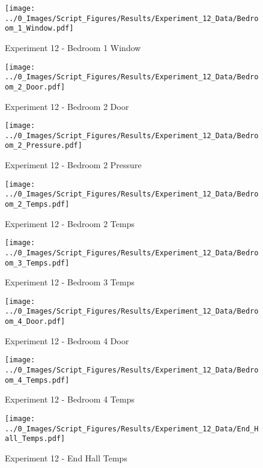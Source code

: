 	\clearpage

	\begin{figure}[H]
		\centering
		\texttt{[image: ../0\_Images/Script\_Figures/Results/Experiment\_12\_Data/Bedroom\_1\_Window.pdf]}
		\caption[]{Experiment 12 - Bedroom 1 Window}
	\end{figure}
 

	\begin{figure}[H]
		\centering
		\texttt{[image: ../0\_Images/Script\_Figures/Results/Experiment\_12\_Data/Bedroom\_2\_Door.pdf]}
		\caption[]{Experiment 12 - Bedroom 2 Door}
	\end{figure}
 
	\clearpage

	\begin{figure}[H]
		\centering
		\texttt{[image: ../0\_Images/Script\_Figures/Results/Experiment\_12\_Data/Bedroom\_2\_Pressure.pdf]}
		\caption[]{Experiment 12 - Bedroom 2 Pressure}
	\end{figure}
 

	\begin{figure}[H]
		\centering
		\texttt{[image: ../0\_Images/Script\_Figures/Results/Experiment\_12\_Data/Bedroom\_2\_Temps.pdf]}
		\caption[]{Experiment 12 - Bedroom 2 Temps}
	\end{figure}
 
	\clearpage

	\begin{figure}[H]
		\centering
		\texttt{[image: ../0\_Images/Script\_Figures/Results/Experiment\_12\_Data/Bedroom\_3\_Temps.pdf]}
		\caption[]{Experiment 12 - Bedroom 3 Temps}
	\end{figure}
 

	\begin{figure}[H]
		\centering
		\texttt{[image: ../0\_Images/Script\_Figures/Results/Experiment\_12\_Data/Bedroom\_4\_Door.pdf]}
		\caption[]{Experiment 12 - Bedroom 4 Door}
	\end{figure}
 
	\clearpage

	\begin{figure}[H]
		\centering
		\texttt{[image: ../0\_Images/Script\_Figures/Results/Experiment\_12\_Data/Bedroom\_4\_Temps.pdf]}
		\caption[]{Experiment 12 - Bedroom 4 Temps}
	\end{figure}
 

	\begin{figure}[H]
		\centering
		\texttt{[image: ../0\_Images/Script\_Figures/Results/Experiment\_12\_Data/End\_Hall\_Temps.pdf]}
		\caption[]{Experiment 12 - End Hall Temps}
	\end{figure}
 
